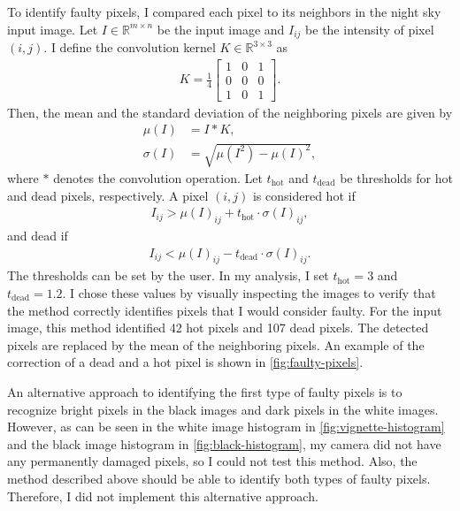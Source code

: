 To identify faulty pixels, I compared each pixel to its neighbors in the night sky input
image. Let $I \in \mathbb{R}^{m \times n}$ be the input image and $I_{ij}$ be the
intensity of pixel $(i,j)$. I define the convolution kernel $K \in \mathbb{R}^{3 \times
    3}$ as
\begin{align*}
  K = \frac{1}{4} \begin{bmatrix}
                    1 & 0 & 1 \\
                    0 & 0 & 0 \\
                    1 & 0 & 1
                  \end{bmatrix}.
\end{align*}
Then, the mean and the standard deviation of the neighboring pixels are given by
\begin{align*}
  \mu(I)    & = I \ast K,                       \\
  \sigma(I) & = \sqrt{\mu(I^{2}) - \mu(I)^{2}},
\end{align*}
where $\ast$ denotes the convolution operation. Let $t_{\text{hot}}$ and $t_{\text{dead}}$
be thresholds for hot and dead pixels, respectively. A pixel $(i,j)$ is considered hot if
\begin{align*}
  I_{ij} > \mu(I)_{ij} + t_{\text{hot}} \cdot \sigma(I)_{ij},
\end{align*}
and dead if
\begin{align*}
  I_{ij} < \mu(I)_{ij} - t_{\text{dead}} \cdot \sigma(I)_{ij}.
\end{align*}
The thresholds can be set by the user. In my analysis, I set $t_{\text{hot}} = 3$ and
$t_{\text{dead}} = 1.2$. I chose these values by visually inspecting the images to verify
that the method correctly identifies pixels that I would consider faulty. For the input
image, this method identified 42 hot pixels and 107 dead pixels. The detected pixels are
replaced by the mean of the neighboring pixels. An example of the correction of a dead and
a hot pixel is shown in \autoref{fig:faulty-pixels}.

An alternative approach to identifying the first type of faulty pixels is to recognize
bright pixels in the black images and dark pixels in the white images. However, as can be
seen in the white image histogram in \autoref{fig:vignette-histogram} and the black image
histogram in \autoref{fig:black-histogram}, my camera did not have any permanently damaged
pixels, so I could not test this method. Also, the method described above should be able
to identify both types of faulty pixels. Therefore, I did not implement this alternative
approach.

